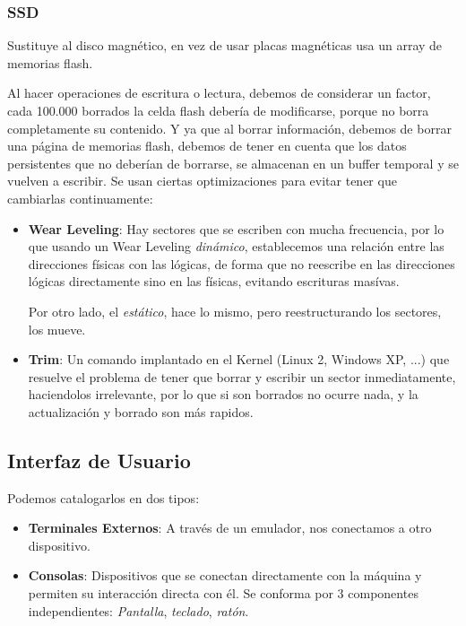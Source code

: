 \subsubsection{SSD}
Sustituye al disco magnético, en vez de usar placas magnéticas usa un array de memorias flash.
\par  Al hacer operaciones de escritura o lectura, debemos de considerar un factor, cada 100.000 borrados la celda flash debería de modificarse, porque no borra completamente su contenido. Y ya que al borrar información, debemos de borrar una página de memorias flash, debemos de tener en cuenta que los datos persistentes que no deberían de borrarse, se almacenan en un buffer temporal y se vuelven a escribir. Se usan ciertas optimizaciones para evitar tener que cambiarlas continuamente:
\begin{itemize}
        \item \textbf{Wear Leveling}: Hay sectores que se escriben con mucha frecuencia, por lo que usando un Wear Leveling \textit{dinámico}, establecemos una relación entre las direcciones físicas con las lógicas, de forma que no reescribe en las direcciones lógicas directamente sino en las físicas, evitando escrituras masívas.\par  Por otro lado, el \textit{estático}, hace lo mismo, pero reestructurando los sectores, los mueve.
        \item \textbf{Trim}: Un comando implantado en el Kernel (Linux 2, Windows XP, ...) que resuelve el problema de tener que borrar y escribir un sector inmediatamente, haciendolos irrelevante, por lo que si son borrados no ocurre nada, y la actualización y borrado son más rapidos.
\end{itemize}
\subsection{Interfaz de Usuario}
Podemos catalogarlos en dos tipos:
\begin{itemize}
        \item \textbf{Terminales Externos}: A través de un emulador, nos conectamos a otro dispositivo.
        \item \textbf{Consolas}: Dispositivos que se conectan directamente con la máquina y permiten su interacción directa con él. Se conforma por 3 componentes independientes: \textit{Pantalla}, \textit{teclado}, \textit{ratón}.
\end{itemize}
